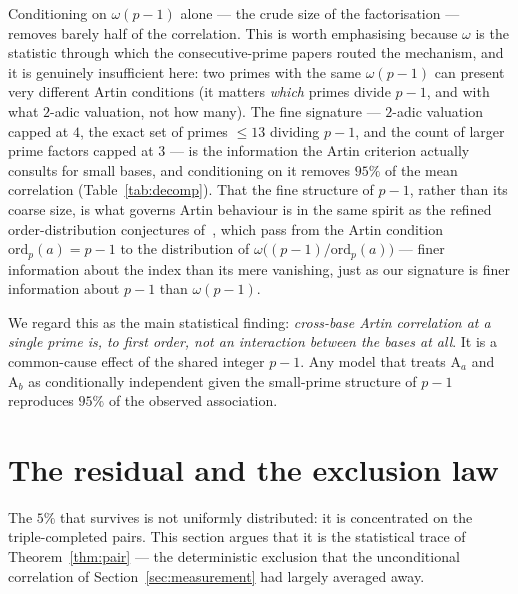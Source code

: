 \documentclass[11pt,reqno]{amsart}
\theoremstyle{plain}
\theoremstyle{definition}
\newcommand{\Art}{\mathrm{A}}
\begin{document}
Conditioning on $\omega(p-1)$ alone --- the crude size of the factorisation
--- removes barely half of the correlation. This is worth emphasising because
$\omega$ is the statistic through which the consecutive-prime papers routed
the mechanism, and it is genuinely insufficient here: two primes with the same
$\omega(p-1)$ can present very different Artin conditions (it matters
\emph{which} primes divide $p-1$, and with what $2$-adic valuation, not how
many). The fine signature --- $2$-adic valuation capped at $4$, the exact set
of primes $\le 13$ dividing $p - 1$, and the count of larger prime factors
capped at $3$ --- is the information the Artin criterion actually consults
for small bases, and conditioning on it removes $95\%$ of the mean
correlation (Table~\ref{tab:decomp}). That the fine structure of $p-1$, rather
than its coarse size, is what governs Artin behaviour is in the same spirit as
the refined order-distribution conjectures
of~\cite{GoldmakherMartinPeringuey2025}, which pass from the Artin condition
$\mathrm{ord}_p(a) = p-1$ to the distribution of
$\omega\bigl((p-1)/\mathrm{ord}_p(a)\bigr)$ --- finer information about the
index than its mere vanishing, just as our signature is finer information about
$p-1$ than $\omega(p-1)$.

We regard this as the main statistical finding: \emph{cross-base Artin
correlation at a single prime is, to first order, not an interaction between
the bases at all}. It is a common-cause effect of the shared integer $p - 1$.
Any model that treats $\Art_a$ and $\Art_b$ as conditionally independent
given the small-prime structure of $p-1$ reproduces $95\%$ of the observed
association.

\section{The residual and the exclusion law}
\label{sec:entanglement}

The $5\%$ that survives is not uniformly distributed: it is concentrated on the triple-completed pairs. This section argues that it is the statistical trace of Theorem~\ref{thm:pair} --- the
deterministic exclusion that the unconditional correlation of
Section~\ref{sec:measurement} had largely averaged away.
\end{document}
